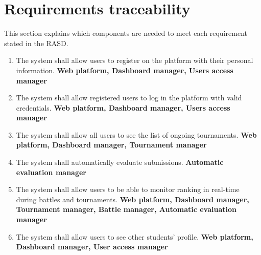 \chapter{Requirements traceability}
This section explains which components are needed to meet each requirement stated in the RASD. 

\begin{enumerate}[label=\textbf{R.\arabic*}]
    \subsubsection*{Users}
    \item {} {The system shall allow users to register on the platform with their personal information.} \newline
    \textbf{Web platform, Dashboard manager, Users access manager}
    \item {} {The system shall allow registered users to log in the platform with valid credentials.} \newline
    \textbf{Web platform, Dashboard manager, Users access manager}
    \item {} {The system shall allow all users to see the list of ongoing tournaments.} \newline
    \textbf{Web platform, Dashboard manager, Tournament manager}
    \item {} {The system shall automatically evaluate submissions.} \newline
    \textbf{Automatic evaluation manager} 
    \item {} {The system shall allow users to be able to monitor ranking in real-time during battles and tournaments.} \newline
    \textbf{Web platform, Dashboard manager, Tournament manager, Battle manager, Automatic evaluation manager} 
    \item {} {The system shall allow users to see other students' profile.} \newline
    \textbf{Web platform, Dashboard manager, User access manager}
    

\end{enumerate}
